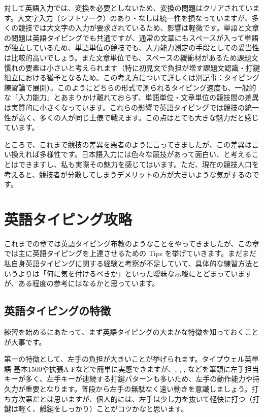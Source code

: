 対して英語入力では、変換を必要としないため、変換の問題はクリアされています。大文字入力（シフトワーク）のあり・なしは統一性を損なっていますが、多くの競技では大文字の入力が要求されているため、影響は軽微です。単語と文章の問題は英語タイピングでも共通ですが、通常の文章にもスペースが入って単語が独立しているため、単語単位の競技でも、入力能力測定の手段としての妥当性は比較的高いでしょう。また文章単位でも、スペースの緩衝材があるため課題文慣れの要素は小さいと考えられます（特に初見文で負担が増す課題文認識・打鍵組立における猶予となるため。この考え方について詳しくは別記事：タイピング練習論で展開）。このようにどちらの形式で測られるタイピング速度も、一般的な「入力能力」とあまりかけ離れておらず、単語単位・文章単位の競技間の差異は実質的に小さくなっています。これらの影響で英語タイピングでは競技の統一性が高く、多くの人が同じ土俵で戦えます。この点はとても大きな魅力だと感じています。

ところで、これまで競技の差異を悪者のように言ってきましたが、この差異は言い換えれば多様性です。日本語入力には色々な競技があって面白い、と考えることはできますし、私も実際その魅力を感じてはいます。ただ、現在の競技人口を考えると、競技者が分散してしまうデメリットの方が大きいような気がするのです。

\section{英語タイピング攻略}

これまでの章では英語タイピング布教のようなことをやってきましたが、この章では主に英語タイピングを上達させるための Tips を挙げていきます。まだまだ私自身英語タイピングに関する経験と考察が不足していて、具体的な練習方法というよりは「何に気を付けるべきか」といった曖昧な示唆にとどまっていますが、ある程度の参考にはなるかと思っています。

\subsection{英語タイピングの特徴}

練習を始めるにあたって、まず英語タイピングの大まかな特徴を知っておくことが大事です。

第一の特徴として、左手の負担が大きいことが挙げられます。タイプウェル英単語 基本1500や拡張A-Fなどで簡単に実感できますが、, , ,  などを筆頭に左手担当キーが多く、左手キーが連続する打鍵パターンも多いため、左手の動作能力や持久力が重要となります。普段から左手の無駄なく速い動きを意識しましょう。打ち方次第だとは思いますが、個人的には、左手は少し力を抜いて軽快に打つ（打鍵は軽く、離鍵をしっかり）ことがコツかなと思います。

